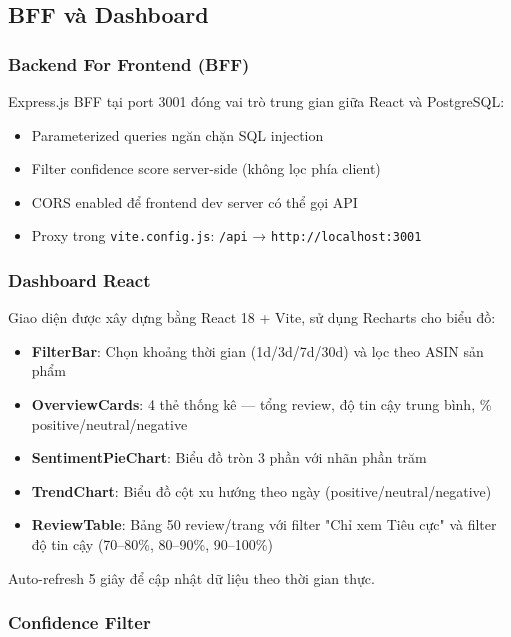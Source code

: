 \subsection{BFF và Dashboard}

\subsubsection{Backend For Frontend (BFF)}

Express.js BFF tại port 3001 đóng vai trò trung gian giữa React và PostgreSQL:
\begin{itemize}
    \item Parameterized queries ngăn chặn SQL injection
    \item Filter confidence score server-side (không lọc phía client)
    \item CORS enabled để frontend dev server có thể gọi API
    \item Proxy trong \texttt{vite.config.js}: \texttt{/api} → \texttt{http://localhost:3001}
\end{itemize}

\subsubsection{Dashboard React}

Giao diện được xây dựng bằng React 18 + Vite, sử dụng Recharts cho biểu đồ:

\begin{itemize}
    \item \textbf{FilterBar}: Chọn khoảng thời gian (1d/3d/7d/30d) và lọc theo ASIN sản phẩm
    \item \textbf{OverviewCards}: 4 thẻ thống kê — tổng review, độ tin cậy trung bình, \% positive/neutral/negative
    \item \textbf{SentimentPieChart}: Biểu đồ tròn 3 phần với nhãn phần trăm
    \item \textbf{TrendChart}: Biểu đồ cột xu hướng theo ngày (positive/neutral/negative)
    \item \textbf{ReviewTable}: Bảng 50 review/trang với filter "Chỉ xem Tiêu cực" và filter độ tin cậy (70–80\%, 80–90\%, 90–100\%)
\end{itemize}

Auto-refresh 5 giây để cập nhật dữ liệu theo thời gian thực.

\subsubsection{Confidence Filter}

